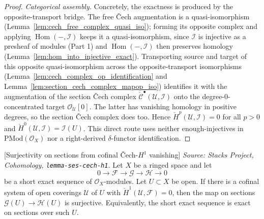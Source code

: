 \begin{proof}
  \emph{Categorical assembly.} Concretely, the exactness is produced by the
  opposite-transport bridge. The free {\v C}ech augmentation is a quasi-isomorphism
  (Lemma~\ref{lem:cech_free_complex_quasi_iso}); forming its opposite complex and
  applying \(\operatorname{Hom}(-, \mathcal{I})\) keeps it a quasi-isomorphism, since
  \(\mathcal{I}\) is injective as a presheaf of modules (Part 1) and
  \(\operatorname{Hom}(-, \mathcal{I})\) then preserves homology
  (Lemma~\ref{lem:hom_into_injective_exact}). Transporting source and target of this
  opposite quasi-isomorphism across the opposite-transport isomorphisms
  (Lemma~\ref{lem:cech_complex_op_identification} and
  Lemma~\ref{lem:section_cech_complex_mapop_iso}) identifies it with the augmentation
  of the section {\v C}ech complex \(\check{\mathcal{C}}^\bullet(\mathcal{U},
  \mathcal{I})\) onto the degree-\(0\)-concentrated target \(\mathcal{O}_{\mathcal{U}}[0]\).
  The latter has vanishing homology in positive degrees, so the section {\v C}ech complex
  does too. Hence \(\check{H}^p(\mathcal{U}, \mathcal{I}) = 0\) for all \(p > 0\) and
  \(\check{H}^0(\mathcal{U}, \mathcal{I}) = \mathcal{I}(U)\). This direct route uses
  neither enough-injectives in \(\mathrm{PMod}(\mathcal{O}_X)\) nor a right-derived
  \(\delta\)-functor identification.
\end{proof}

\begin{lemma}

[Surjectivity on sections from cofinal {\v C}ech-$H^1$ vanishing]
  \label{lem:ses_cech_h1}
  \textit{Source: Stacks Project, Cohomology,
  \texttt{lemma-ses-cech-h1}.}
  Let \(X\) be a ringed space and let
  \[
    0 \to \mathcal{F} \to \mathcal{G} \to \mathcal{H} \to 0
  \]
  be a short exact sequence of \(\mathcal{O}_X\)-modules. Let \(U \subset X\) be
  open. If there is a cofinal system of open coverings \(\mathcal{U}\) of \(U\) with
  \(\check{H}^1(\mathcal{U}, \mathcal{F}) = 0\), then the map on sections
  \(\mathcal{G}(U) \to \mathcal{H}(U)\) is surjective. Equivalently, the short exact
  sequence is exact on sections over such \(U\).
\end{lemma}

